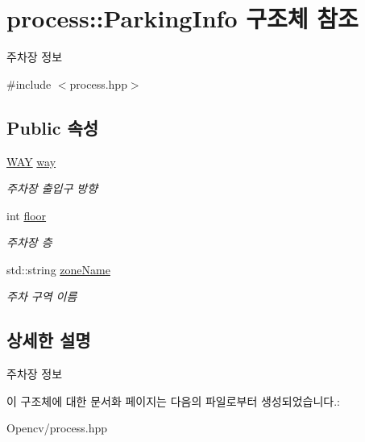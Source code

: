 \hypertarget{structprocess_1_1_parking_info}{}\section{process\+:\+:Parking\+Info 구조체 참조}
\label{structprocess_1_1_parking_info}


주차장 정보  




{\ttfamily \#include $<$process.\+hpp$>$}

\subsection*{Public 속성}
\begin{DoxyCompactItemize}
\item 
\mbox{\label{structprocess_1_1_parking_info_a21cc54db5d5a701d62b544d13224bafe}} 
\hyperlink{namespaceprocess_aa30669026e4cf69a2550aace23bef68e}{W\+AY} \hyperlink{structprocess_1_1_parking_info_a21cc54db5d5a701d62b544d13224bafe}{way}
\begin{DoxyCompactList}\small\item\em 주차장 출입구 방향 \end{DoxyCompactList}\item 
\mbox{\label{structprocess_1_1_parking_info_a0f83caa9ca3bf71e33a79db65ef4bff8}} 
int \hyperlink{structprocess_1_1_parking_info_a0f83caa9ca3bf71e33a79db65ef4bff8}{floor}
\begin{DoxyCompactList}\small\item\em 주차장 층 \end{DoxyCompactList}\item 
\mbox{\label{structprocess_1_1_parking_info_a0435386b258dfafdebcf6ce33648cc8d}} 
std\+::string \hyperlink{structprocess_1_1_parking_info_a0435386b258dfafdebcf6ce33648cc8d}{zone\+Name}
\begin{DoxyCompactList}\small\item\em 주차 구역 이름 \end{DoxyCompactList}\end{DoxyCompactItemize}


\subsection{상세한 설명}
주차장 정보 

이 구조체에 대한 문서화 페이지는 다음의 파일로부터 생성되었습니다.\+:\begin{DoxyCompactItemize}
\item 
Opencv/process.\+hpp\end{DoxyCompactItemize}

